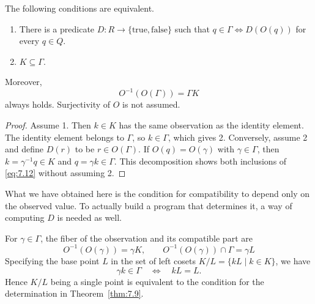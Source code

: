 \begin{theorem}\label{thm:7.9}

The following conditions are equivalent.

\begin{enumerate}
\item There is a predicate $D:R\to\{\text{true},\text{false}\}$ such that
$q\in\Gamma\Longleftrightarrow D(O(q))$ for every $q\in Q$.
\item $K\subseteq\Gamma$.
\end{enumerate}

Moreover,
\begin{equation*}
O^{-1}(O(\Gamma))=\Gamma K
\tag{7.12}\label{eq:7.12}
\end{equation*}
always holds. Surjectivity of $O$ is not assumed.

\end{theorem}

\begin{proof}

Assume 1. Then $k\in K$ has the same observation as the identity element.
The identity element belongs to $\Gamma$, so $k\in\Gamma$, which gives 2.
Conversely, assume 2 and define $D(r)$ to be $r\in O(\Gamma)$.
If $O(q)=O(\gamma)$ with $\gamma\in\Gamma$, then
$k=\gamma^{-1}q\in K$ and $q=\gamma k\in\Gamma$.
This decomposition shows both inclusions of \eqref{eq:7.12} without assuming 2.

\end{proof}

What we have obtained here is the condition for compatibility to depend only on the observed
value.
To actually build a program that determines it, a way of computing $D$ is needed as well.

\begin{proposition}\label{prop:7.10}

For $\gamma\in\Gamma$, the fiber of the observation and its compatible part are
\begin{equation*}
O^{-1}(O(\gamma))=\gamma K,\qquad
O^{-1}(O(\gamma))\cap\Gamma=\gamma L
\tag{7.13}\label{eq:7.13}
\end{equation*}
Specifying the base point $L$ in the set of left cosets $K/L=\{kL\mid k\in K\}$, we have
\begin{equation*}
\gamma k\in\Gamma\quad\Longleftrightarrow\quad kL=L.
\tag{7.14}\label{eq:7.14}
\end{equation*}
Hence $K/L$ being a single point is equivalent to the condition for the determination in
Theorem~\ref{thm:7.9}.

\end{proposition}

